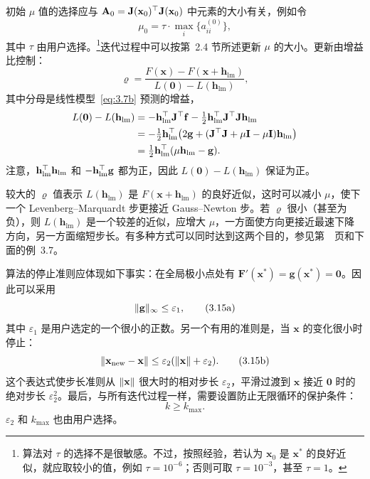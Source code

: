 初始 $\mu$ 值的选择应与 $\mathbf{A}_0=\mathbf{J}(\mathbf{x}_0)^{\top}\mathbf{J}(\mathbf{x}_0)$ 中元素的大小有关，例如令
\begin{equation}
  \mu_0=\tau\cdot\max_i\{a_{ii}^{(0)}\},
  \tag{3.14}\label{eq:3.14}
\end{equation}
其中 $\tau$ 由用户选择。\footnote[3]{算法对 $\tau$ 的选择不是很敏感。不过，按照经验，若认为 $\mathbf{x}_0$ 是 $\mathbf{x}^*$ 的良好近似，就应取较小的值，例如 $\tau=10^{-6}$；否则可取 $\tau=10^{-3}$，甚至 $\tau=1$。}迭代过程中可以按第~2.4 节所述更新 $\mu$ 的大小。更新由增益比控制：
\[
  \varrho=\frac{F(\mathbf{x})-F(\mathbf{x}+\mathbf{h}_{\mathrm{lm}})}{L(\mathbf{0})-L(\mathbf{h}_{\mathrm{lm}})},
\]
其中分母是线性模型~\eqref{eq:3.7b} 预测的增益，
\[
\begin{aligned}
 L(\mathbf{0})-L(\mathbf{h}_{\mathrm{lm}})
  &=-\mathbf{h}_{\mathrm{lm}}^{\top}\mathbf{J}^{\top}\mathbf{f}
      -\tfrac12\mathbf{h}_{\mathrm{lm}}^{\top}\mathbf{J}^{\top}\mathbf{J}\mathbf{h}_{\mathrm{lm}}\\
  &=-\tfrac12\mathbf{h}_{\mathrm{lm}}^{\top}
      \bigl(2\mathbf{g}+(\mathbf{J}^{\top}\mathbf{J}+\mu \mathbf{I}-\mu \mathbf{I})\mathbf{h}_{\mathrm{lm}}\bigr)\\
  &=\tfrac12\mathbf{h}_{\mathrm{lm}}^{\top}(\mu \mathbf{h}_{\mathrm{lm}}-\mathbf{g}).
\end{aligned}
\]
注意，$\mathbf{h}_{\mathrm{lm}}^{\top}\mathbf{h}_{\mathrm{lm}}$ 和 $-\mathbf{h}_{\mathrm{lm}}^{\top}\mathbf{g}$ 都为正，因此 $L(\mathbf{0})-L(\mathbf{h}_{\mathrm{lm}})$ 保证为正。

较大的 $\varrho$ 值表示 $L(\mathbf{h}_{\mathrm{lm}})$ 是 $F(\mathbf{x}+\mathbf{h}_{\mathrm{lm}})$ 的良好近似，这时可以减小 $\mu$，使下一个 Levenberg--Marquardt
步更接近 Gauss--Newton 步。若 $\varrho$ 很小（甚至为负），则 $L(\mathbf{h}_{\mathrm{lm}})$ 是一个较差的近似，应增大 $\mu$，一方面使方向更接近最速下降方向，另一方面缩短步长。有多种方式可以同时达到这两个目的，参见第~\pageref{src:14}~页和下面的例~3.7。

算法的停止准则应体现如下事实：在全局极小点处有 $\mathbf{F}'(\mathbf{x}^*)=\mathbf{g}(\mathbf{x}^*)=\mathbf{0}$。因此可以采用
\begin{equation}
  \lVert\mathbf{g}\rVert_{\infty}\leq\varepsilon_1,
  \tag{3.15a}\label{eq:3.15a}
\end{equation}
其中 $\varepsilon_1$ 是用户选定的一个很小的正数。另一个有用的准则是，当 $\mathbf{x}$ 的变化很小时停止：
\begin{equation}
  \lVert\mathbf{x}_{\mathrm{new}}-\mathbf{x}\rVert\leq\varepsilon_2(\lVert\mathbf{x}\rVert+\varepsilon_2).
  \tag{3.15b}\label{eq:3.15b}
\end{equation}
这个表达式使步长准则从 $\lVert\mathbf{x}\rVert$ 很大时的相对步长 $\varepsilon_2$，平滑过渡到 $\mathbf{x}$ 接近 $\mathbf{0}$ 时的绝对步长 $\varepsilon_2^2$。最后，与所有迭代过程一样，需要设置防止无限循环的保护条件：
\begin{equation}
  k\geq k_{\max}.
  \tag{3.15c}\label{eq:3.15c}
\end{equation}
$\varepsilon_2$ 和 $k_{\max}$ 也由用户选择。

